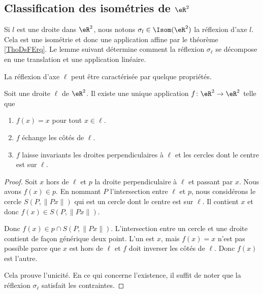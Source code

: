 \subsection{Classification des isométries de \( \eR^2\)}

Si \( l\) est une droite dans \( \eR^2\), nous notons \( \sigma_l\in\Isom(\eR^2)\) la réflexion d'axe \( l\). Cela est une isométrie et donc une application affine par le théorème \ref{ThoDsFErq}. Le lemme suivant détermine comment la réflexion \( \sigma_{\ell}\) se décompose en une translation et une application linéaire.

La réflexion d'axe \( \ell\) peut être caractérisée par quelque propriétés.

\begin{lemma}
    Soit une droite \( \ell\) de \( \eR^2\). Il existe une unique application \( f\colon \eR^2\to \eR^2\) telle que
    \begin{enumerate}
        \item
            \( f(x)=x\) pour tout \( x\in \ell\).
        \item
            \( f\) échange les côtés de \( \ell\).
        \item
            \( f\) laisse invariants les droites perpendiculaires à \( \ell\) et les cercles dont le centre est sur \( \ell\).
    \end{enumerate}
\end{lemma}

\begin{proof}
    Soit \( x\) hors de \( \ell\) et \( p\) la droite perpendiculaire à \( \ell\) et passant par \( x\). Nous avons \( f(x)\in p\). En nommant \( P\) l'intersection entre \( \ell\) et \( p\), nous considérons le cercle \( S(P,\| Px \|)\) qui est un cercle dont le centre est sur \( \ell\). Il contient \( x\) et donc \( f(x)\in S(P,\| Px \|)\).

    Donc \( f(x)\in p\cap S(P,\| Px \|)\). L'intersection entre un cercle et une droite contient de façon générique deux point. L'un est \( x\), mais \( f(x)=x\) n'est pas possible parce que \( x\) est hors de \( \ell\) et \( f\) doit inverser les côtés de \( \ell\). Donc \( f(x)\) est l'autre.

    Cela prouve l'unicité. En ce qui concerne l'existence, il suffit de noter que la réflexion \( \sigma_{\ell}\) satisfait les contraintes.
\end{proof}

